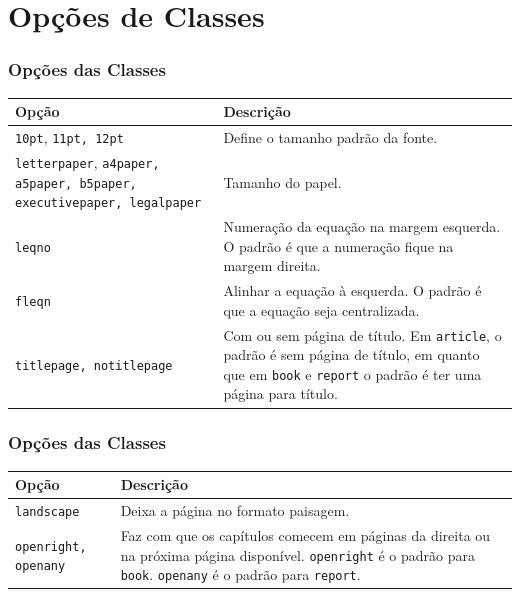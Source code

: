 \documentclass{beamer}
\begin{document}
\section{Opções de Classes}

\begin{frame}
    \frametitle{Opções das Classes}
\begin{table}[h]\small
    \begin{tabularx}{\textwidth}{XX}
        \hline
        \textbf{Opção} & \textbf{Descrição} \\ \hline
        \lstinline[basicstyle={\bfseries\footnotesize}]!10pt!, \lstinline[]!11pt, 12pt! & Define o tamanho padrão da fonte. \\ \hline
        \lstinline[basicstyle={\bfseries\footnotesize}]!letterpaper!, \lstinline[]!a4paper, a5paper, b5paper, executivepaper, legalpaper! & Tamanho do papel. \\ \hline
        \lstinline[]!leqno! & Numeração da equação na margem esquerda. O padrão é que a numeração fique na margem direita. \\ \hline
        \lstinline[]!fleqn! & Alinhar a equação à esquerda. O padrão é que a equação seja centralizada. \\ \hline
        \lstinline!titlepage, notitlepage! & Com ou sem página de título. Em \lstinline!article!, o padrão é sem página de título, em quanto que em \lstinline!book! e \lstinline!report! o padrão é ter uma página para título. \\ \hline
    \end{tabularx}
\end{table}
\end{frame}

\begin{frame}
    \frametitle{Opções das Classes}
\begin{table}[h]\small
    \begin{tabularx}{\textwidth}{XX}
        \hline
        \textbf{Opção} & \textbf{Descrição} \\ \hline
        \lstinline!landscape! & Deixa a página no formato paisagem. \\ \hline
        \lstinline!openright, openany! & Faz com que os capítulos comecem em páginas da direita ou na próxima página disponível. \lstinline!openright! é o padrão para \lstinline!book!. \lstinline!openany! é o padrão para \lstinline!report!. \\ \hline
    \end{tabularx}
\end{table}
\end{frame}
\end{document}
